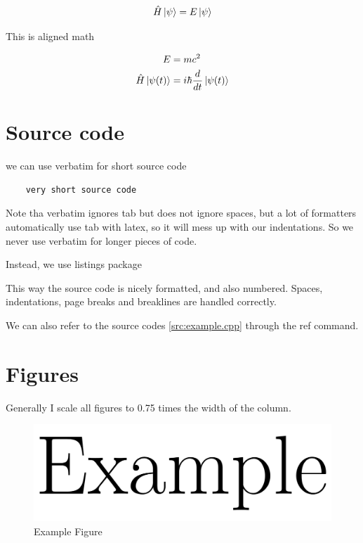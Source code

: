 \documentclass{article}
\begin{document}
\begin{equation*}
	\hat H \ket{\psi} = E \ket{\psi}
\end{equation*}

This is aligned math

\begin{equation}
	\begin{aligned}
		E    & = mc^2 \\
		\hat H \ket{\psi(t)} &= i\hbar \frac{d}{dt} \ket{\psi(t)}    \\
	\end{aligned}
\end{equation}

\section{Source code}

we can use verbatim for short source code

\begin{verbatim}
    very short source code
\end{verbatim}

Note tha verbatim ignores tab but does not ignore spaces, but a lot of formatters automatically use tab with latex, so it will mess up with our indentations.
So we never use verbatim for longer pieces of code.

Instead, we use listings package



This way the source code is nicely formatted, and also numbered.
Spaces, indentations, page breaks and breaklines are handled correctly.

We can also refer to the source codes \ref{src:example.cpp} through the ref command.

\section{Figures}

Generally I scale all figures to 0.75 times the width of the column.

\begin{figure}
	\begin{center}
		\includegraphics[width=0.75\columnwidth]{figs/example.png}
	\end{center}
	\caption{Example Figure}
	\label{fig:example.png}
\end{figure}
\end{document}
